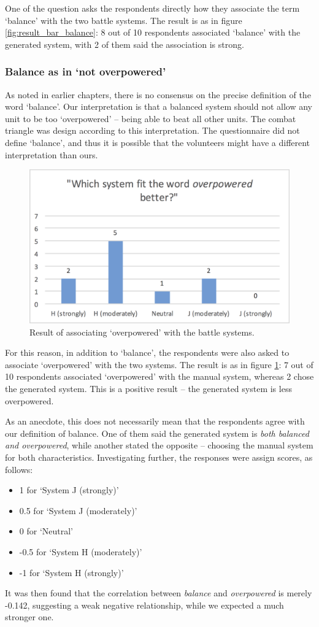 One of the question asks the respondents directly how they associate the term `balance' with the two battle systems. The result is as in figure \ref{fig:result_bar_balance}: 8 out of 10 respondents associated `balance' with the generated system, with 2 of them said the association is strong.

\subsubsection*{Balance as in `not overpowered'}

As noted in earlier chapters, there is no consensus on the precise definition of the word `balance'. Our interpretation is that a balanced system should not allow any unit to be too `overpowered' -- being able to beat all other units. The combat triangle was design according to this interpretation. The questionnaire did not define `balance', and thus it is possible that the volunteers might have a different interpretation than ours.

\begin{figure}
	\centering
	\includegraphics[width=0.6\linewidth]{figures/bar_op}
	\caption{Result of associating `overpowered' with the battle systems.}
	\label{fig:result_bar_op}
\end{figure}

For this reason, in addition to `balance', the respondents were also asked to associate `overpowered' with the two systems. The result is as in figure \ref{fig:result_bar_op}: 7 out of 10 respondents associated `overpowered' with the manual system, whereas 2 chose the generated system. This is a positive result -- the generated system is less overpowered.

As an anecdote, this does not necessarily mean that the respondents agree with our definition of balance. One of them said the generated system is \textit{both balanced and overpowered}, while another stated the opposite -- choosing the manual system for both characteristics. Investigating further, the responses were assign scores, as follows:
\begin{itemize}
	\item 1 for `System J (strongly)'
	\item 0.5 for `System J (moderately)'
	\item 0 for `Neutral'
	\item -0.5 for `System H (moderately)'
	\item -1 for `System H (strongly)'
\end{itemize}
It was then found that the correlation between \textit{balance} and \textit{overpowered} is merely -0.142, suggesting a weak negative relationship, while we expected a much stronger one.

